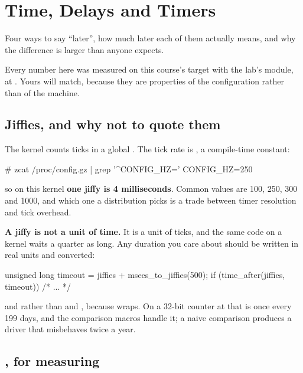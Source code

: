 
\section{Time, Delays and Timers}
\label{c9:app:b}

Four ways to say ``later'', how much later each of them actually means, and why the difference is
larger than anyone expects.

Every number here was measured on this course's target with the lab's  module, at
. Yours will match, because they are properties of the configuration rather than of the
machine.

\subsection{Jiffies, and why not to quote them}
\label{c9:app:b1}

The kernel counts ticks in a global . The tick rate is , a compile-time
constant:

\begin{console}
# zcat /proc/config.gz | grep '^CONFIG_HZ='
CONFIG_HZ=250
\end{console}

\noindent so on this kernel \textbf{one jiffy is 4 milliseconds}. Common values are 100, 250, 300
and 1000, and which one a distribution picks is a trade between timer resolution and tick overhead.

\textbf{A jiffy is not a unit of time.} It is a unit of ticks, and the same code on a 
kernel waits a quarter as long. Any duration you care about should be written in real units and
converted:

\begin{ccode}
unsigned long timeout = jiffies + msecs_to_jiffies(500);
if (time_after(jiffies, timeout)) { /* ... */ }
\end{ccode}

\noindent {} and  rather than \code{<} and \code{>}, because
 wraps. On a 32-bit counter at  that is once every 199 days, and the
comparison macros handle it; a naive comparison produces a driver that misbehaves twice a year.

\subsection{, for measuring}
\label{c9:app:b2}

